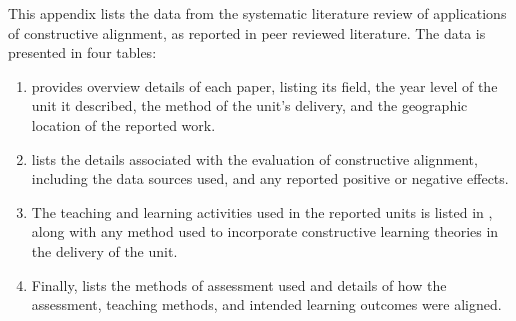 \newcommand{\poc}{\begin{sideways}\textbf{Outcomes~ }\end{sideways}}			%
\newcommand{\pst}{\begin{sideways}\textbf{Satisfaction~ }\end{sideways}}			%
\newcommand{\peg}{\begin{sideways}\textbf{Engagement~ }\end{sideways}}			%
\newcommand{\pot}{\begin{sideways}\textbf{Other}\end{sideways}}			%
\newcommand{\nst}{\begin{sideways}\textbf{Staff Workload~ }\end{sideways}}			%
\newcommand{\nsd}{\begin{sideways}\textbf{Student Workload~ }\end{sideways}}			%
\newcommand{\nor}{\begin{sideways}\textbf{Other~ }\end{sideways}}			%
\newcommand{\noe}{\begin{sideways}\textbf{No Evaluation~ }\end{sideways}}			%

\newcommand{\intlec}{\begin{sideways}\textbf{Interactive Classes~ }\end{sideways}}			%

\renewcommand{\arraystretch}{1}

This appendix lists the data from the systematic literature review of applications of constructive alignment, as reported in peer reviewed literature. The data is presented in four tables: 

\begin{enumerate}
	\item {} provides overview details of each paper, listing its field, the year level of the unit it described, the method of the unit's delivery, and the geographic location of the reported work. 
	\item {} lists the details associated with the evaluation of constructive alignment, including the data sources used, and any reported positive or negative effects. 
	\item The teaching and learning activities used in the reported units is listed in , along with any method used to incorporate constructive learning theories in the delivery of the unit. 
	\item Finally,  lists the methods of assessment used and details of how the assessment, teaching methods, and intended learning outcomes were aligned.
\end{enumerate}

